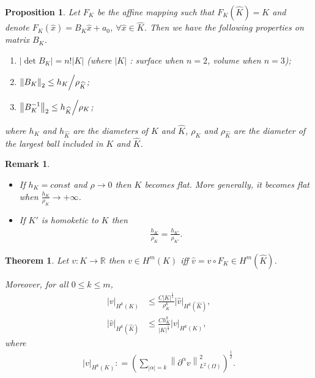 \documentclass[11pt,a4paper,center,notitlepage]{article}
\numberwithin{equation}{section}
\newtheorem{prop}{Proposition}[section]
\newtheorem{theorem}{Theorem}[section]
\newtheorem{remark}{Remark}[section]
\begin{document}
\begin{prop}
Let $F_K$ be the affine mapping such that $F_K\left(\widehat{K}\right) =K$ and denote ${F_K}\left( {\widehat x} \right) = {B_K}\widehat x + {a_0}$, $\forall \widehat x \in \widehat K$. Then we have the following properties on matrix $B_K$.
\begin{enumerate}
\item $\left| {\det {B_K}} \right| = n!\left| K \right|$ (where $\left| K \right|$ : surface when $n=2$, volume when $n=3$);
\item ${\left\| {{B_K}} \right\|_2} \le {{{h_K}} \mathord{\left/
 {\vphantom {{{h_K}} {{\rho _{\widehat K}}}}} \right.
 \kern-\nulldelimiterspace} {{\rho _{\widehat K}}}}$;
\item ${\left\| {B_K^{ - 1}} \right\|_2} \le {{{h_{\widehat K}}} \mathord{\left/
 {\vphantom {{{h_{\widehat K}}} {{\rho _K}}}} \right.
 \kern-\nulldelimiterspace} {{\rho _K}}}$;
\end{enumerate}
where $h_K$ and $h_{\widehat{K}}$ are the diameters of $K$ and $\widehat{K}$, $\rho _K$ and $\rho _{\widehat{K}}$ are the diameter of the largest ball included in $K$ and $\widehat{K}$.
\end{prop}

\begin{remark}
\begin{itemize}
\item If $h_K =const$ and $\rho \to 0$ then $K$ becomes flat. More generally, it becomes flat when $\frac{{{h_K}}}{{{\rho _K}}} \to  + \infty $.
\item If $K'$ is homoketic to $K$ then
\begin{align}
\frac{{{h_K}}}{{{\rho _K}}} = \frac{{{h_{K'}}}}{{{\rho _{K'}}}} .
\end{align}
\end{itemize}
\end{remark}

\begin{theorem}
Let $v: K\to \mathbb{R}$ then $v\in H^m\left(K\right)$ iff $\widehat v = v \circ {F_K} \in {H^m}\left( {\widehat K} \right)$. 

Moreover, for all $0\le k\le m$,
\begin{align}
{\left| v \right|_{{H^k}\left( K \right)}} &\le \frac{{C{{\left| K \right|}^{\frac{1}{2}}}}}{{\rho _K^k}}{\left| {\widehat v} \right|_{{H^k}\left( {\widehat K} \right)}},\\
{\left| {\widehat v} \right|_{{H^k}\left( {\widehat K} \right)}} &\le \frac{{Ch_K^k}}{{{{\left| K \right|}^{\frac{1}{2}}}}}{\left| v \right|_{{H^k}\left( K \right)}},
\end{align}
where 
\begin{align}
{\left| v \right|_{{H^k}\left( K \right)}}: = {\left( {\sum\limits_{\left| \alpha  \right| = k} {\left\| {{\partial ^\alpha }v} \right\|_{{L^2}\left( \Omega  \right)}^2} } \right)^{\frac{1}{2}}} .
\end{align}
\end{theorem}
\end{document}
